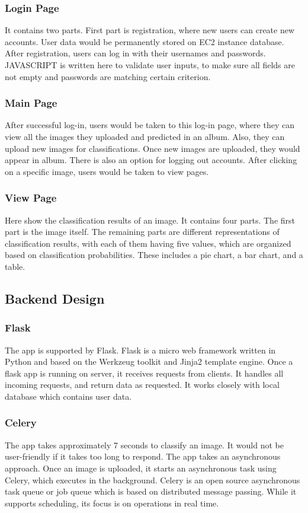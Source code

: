 \documentclass[conference]{IEEEtran}
\begin{document}
\subsubsection{Login Page}
It contains two parts. First part is registration, where new users can create new accounts. User data would be permanently stored on EC2 instance database. After registration, users can log in with their usernames and passwords. JAVASCRIPT is written here to validate user inputs, to make sure all fields are not empty and passwords are matching certain criterion.

\subsubsection{Main Page}
After successful log-in, users would be taken to this log-in page, where they can view all the images they uploaded and predicted in an album. Also, they can upload new images for classifications. Once new images are uploaded, they would appear in album. There is also an option for logging out accounts. After clicking on a specific image, users would be taken to view pages.

\subsubsection{View Page}
Here show the classification results of an image. It contains four parts. The first part is the image itself. The remaining parts are different representations of classification results, with each of them having five values, which are organized based on classification probabilities. These includes a pie chart, a bar chart, and a table.

\subsection{Backend Design}

\subsubsection{Flask}
The app is supported by Flask. Flask is a micro web framework written in Python and based on the Werkzeug toolkit and Jinja2 template engine.\cite{wiki:flask} Once a flask app is running on server, it receives requests from clients. It handles all incoming requests, and return data as requested. It works closely with local database which contains user data.

\subsubsection{Celery}
The app takes approximately 7 seconds to classify an image. It would not be user-friendly if it takes too long to respond. The app takes an asynchronous approach. Once an image is uploaded, it starts an asynchronous task using Celery, which executes in the background. Celery is an open source asynchronous task queue or job queue which is based on distributed message passing. While it supports scheduling, its focus is on operations in real time.\cite{wiki:flask}
\end{document}
